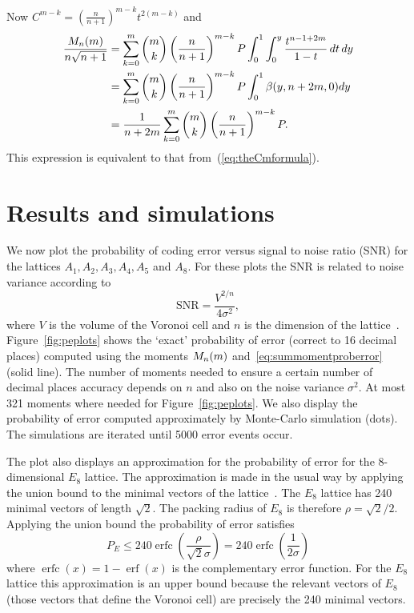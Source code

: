\documentclass[journal, onecolumn, 11pt]{IEEEtran}
\begin{document}
Now $C^{m-k} = \left(\frac{n}{n+1} \right)^{m-k} t^{2(m-k)}$ and
\begin{align*}
\frac{M_n(m)}{n\sqrt{n+1}} &= \sum_{k=0}^{m} \binom{m}{k} \left(\frac{n}{n+1} \right)^{m-k} P \int_0^1 \int_0^y \frac{t^{n - 1 + 2m}}{1 - t} \, dt \, dy \\
&= \sum_{k=0}^{m} \binom{m}{k} \left(\frac{n}{n+1} \right)^{m-k} P \int_0^1 \beta(y,n+2m,0) dy \\
&= \frac{1}{n+2m} \sum_{k=0}^{m} \binom{m}{k} \left(\frac{n}{n+1} \right)^{m-k} P.
\end{align*}
This expression is equivalent to that from~(\ref{eq:theCmformula}).


\section{Results and simulations}\label{sec:results-simulations}

We now plot the probability of coding error versus signal to noise ratio (SNR) for the lattices $A_1, A_2, A_3, A_4, A_5$ and $A_8$.  For these plots the SNR is related to noise variance according to
\[
\text{SNR} = \frac{V^{2/n}}{4\sigma^2},
\]
where $V$ is the volume of the Voronoi cell and $n$ is the dimension of the lattice~\cite[p. 167]{Viterbo_diamond_cutting_1996}.  Figure~\ref{fig:peplots} shows the `exact' probability of error (correct to 16 decimal places) computed using the moments $M_n(m)$ and~\eqref{eq:summomentproberror} (solid line).  The number of moments needed to ensure a certain number of decimal places accuracy depends on $n$ and also on the noise variance $\sigma^2$.  At most 321 moments where needed for Figure~\ref{fig:peplots}.  We also display the probability of error computed approximately by Monte-Carlo simulation (dots).  %
The simulations are iterated until 5000 error events occur.

The plot also displays an approximation for the probability of error for the 8-dimensional $E_8$ lattice.  The approximation is made in the usual way by applying the union bound to the minimal vectors of the lattice~\cite[p.~71]{SPLAG}.  The $E_8$ lattice has 240 minimal vectors of length $\sqrt{2}$.  The packing radius of $E_8$ is therefore $\rho = \sqrt{2}/2$.  Applying the union bound the probability of error satisfies
\newcommand{\erfc}{\operatorname{erfc}}
\newcommand{\erf}{\operatorname{erf}}
\[
P_E \leq 240\erfc\left( \frac{\rho}{\sqrt{2}\sigma} \right) = 240\erfc\left(\frac{1}{2\sigma}\right)
\]
where $\erfc(x) = 1 - \erf(x)$ is the complementary error function.  For the $E_8$ lattice this approximation is an upper bound because the relevant vectors of $E_8$ (those vectors that define the Voronoi cell) are precisely the 240 minimal vectors.  %
\end{document}

